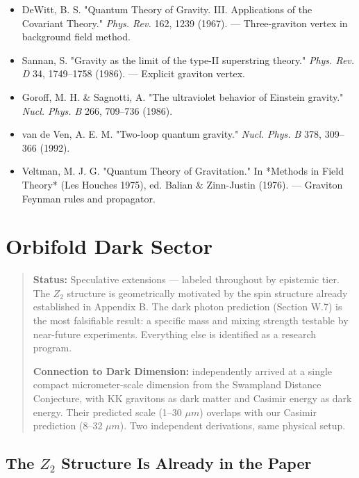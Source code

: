 \documentclass[aps,prd,preprint,superscriptaddress,longbibliography,floatfix]{revtex4-2}
\theoremstyle{remark}
\begin{document}
\begin{itemize}
  \item DeWitt, B. S. "Quantum Theory of Gravity. III. Applications of the Covariant Theory." \textit{Phys. Rev.} 162, 1239 (1967). --- Three-graviton vertex in background field method.
  \item Sannan, S. "Gravity as the limit of the type-II superstring theory." \textit{Phys. Rev. D} 34, 1749--1758 (1986). --- Explicit graviton vertex.
  \item Goroff, M. H. \& Sagnotti, A. "The ultraviolet behavior of Einstein gravity." \textit{Nucl. Phys. B} 266, 709--736 (1986).
  \item van de Ven, A. E. M. "Two-loop quantum gravity." \textit{Nucl. Phys. B} 378, 309--366 (1992).
  \item Veltman, M. J. G. "Quantum Theory of Gravitation." In *Methods in Field Theory* (Les Houches 1975), ed. Balian \& Zinn-Justin (1976). --- Graviton Feynman rules and propagator.
\end{itemize}


\section{Orbifold Dark Sector}


\begin{quote}
\textbf{Status:} Speculative extensions --- labeled throughout by epistemic tier.
The $Z_{2}$ structure is geometrically motivated by the spin structure already
established in Appendix B. The dark photon prediction (Section W.7) is the
most falsifiable result: a specific mass and mixing strength testable by
near-future experiments. Everything else is identified as a research program.

\textbf{Connection to Dark Dimension:} \cite{VafaDarkDimension2022} independently arrived
at a single compact micrometer-scale dimension from the Swampland Distance
Conjecture, with KK gravitons as dark matter and Casimir energy as dark
energy. Their predicted scale (1--30 $\mu m$) overlaps with our Casimir prediction
(8--32 $\mu m$). Two independent derivations, same physical setup.
\end{quote}



\subsection{The $Z_{2}$ Structure Is Already in the Paper}
\end{document}
